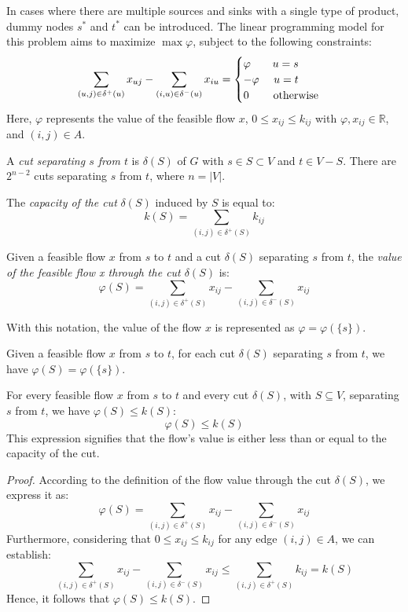 In cases where there are multiple sources and sinks with a single type of product, dummy nodes $s^{*}$ and $t^{*}$ can be introduced. 
The linear programming model for this problem aims to maximize $\max \varphi$, subject to the following constraints:
\[\sum_{(u,j)\in \delta^{+}(u)}x_{uj}-\sum_{(i,u)\in \delta^{-}(u)}x_{iu}=
\begin{cases}
    \varphi \:\:\:\:\:\:\:\:\: u=s    \\
    -\varphi \:\:\:\:\:\: u=t   \\
    0 \:\:\:\:\:\:\:\:\:\: \textnormal{otherwise}
\end{cases}\]
Here, $\varphi$ represents the value of the feasible flow $x$, $0 \leq x_{ij} \leq k_{ij}$ with $\varphi,x_{ij} \in \mathbb{R}$, and $(i,j) \in A$.
\begin{definition}
    A \emph{cut separating $s$ from $t$} is $\delta(S)$ of $G$ with $s \in S \subset V$ and $t \in V-S$. There are $2^{n-2}$ cuts separating $s$ from $t$, where 
    $n=\left\lvert V \right\rvert $.

    The \emph{capacity of the cut} $\delta(S)$ induced by $S$ is equal to: 
    \[k(S)=\sum_{(i,j)\in \delta^{+}(S)}k_{ij}\]

    Given a feasible flow $x$ from $s$ to $t$ and a cut $\delta(S)$ separating $s$ from $t$, the \emph{value of the feasible flow x through the cut $\delta(S)$} is: 
    \[\varphi(S)=\sum_{(i,j)\in \delta^{+}(S)}x_{ij} - \sum_{(i,j)\in \delta^{-}(S)}x_{ij}\]
\end{definition}
With this notation, the value of the flow $x$ is represented as $\varphi = \varphi(\{s\})$. 
\begin{property}
    Given a feasible flow $x$ from $s$ to $t$, for each cut $\delta(S)$ separating $s$ from $t$, we have $\varphi(S)=\varphi(\{s\})$.
\end{property}
\begin{property}
    For every feasible flow $x$ from $s$ to $t$ and every cut $\delta(S)$, with $S \subseteq V$, separating $s$ from $t$, we have $\varphi(S) \leq k(S)$:
    \[\varphi(S) \leq k(S)\]
    This expression signifies that the flow's value is either less than or equal to the capacity of the cut.
\end{property}
\begin{proof}
    According to the definition of the flow value through the cut $\delta(S)$, we express it as:
    \[\varphi(S)=\sum_{(i,j) \in \delta^{+}(S)}x_{ij}-\sum_{(i,j) \in \delta^{-}(S)}x_{ij}\]
    Furthermore, considering that $0 \leq x_{ij } \leq k_{ij}$ for any edge $(i, j) \in A$, we can establish:
    \[\sum_{(i,j) \in \delta^{+}(S)}x_{ij}-\sum_{(i,j) \in \delta^{-}(S)}x_{ij} \leq \sum_{(i,j) \in \delta^{+}(S)}k_{ij}=k(S)\]
    Hence, it follows that $\varphi(S) \leq k(S)$.
\end{proof}
